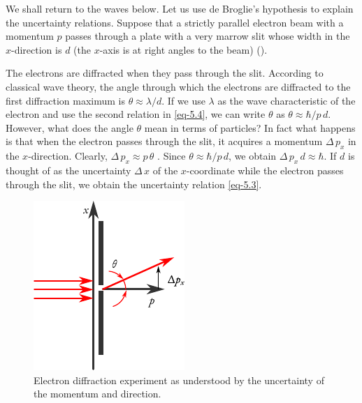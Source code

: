 We shall return to the waves below. Let us use de Broglie's hypothesis
to explain the uncertainty relations. Suppose that a strictly parallel
electron beam with a momentum $p$ passes through a plate with a very
marrow slit whose width in the $x$-direction is $d$ (the $x$-axis is at right
angles to the beam) (). 

The electrons are diffracted when they pass through the slit. According to classical wave theory, the angle through which the electrons are diffracted to the first diffraction maximum is $\theta \approx \lambda / d$. If we use $\lambda$ as the wave characteristic of the electron and use the second relation in \eqref{eq-5.4}, we can write $\theta$ as $\theta \approx \hbar /p \, d$. However, what does the angle $\theta$ mean in terms of particles? In fact what happens is that when the electron passes through the slit, it acquires a momentum $\Delta \, p_{x}$ in the $x$-direction. Clearly,  $\Delta \, p_{x} \approx p \, \theta$ . Since $ \theta \approx \hbar /p \, d$, we obtain  $\Delta \, p_{x} \, d \approx \hbar$. If $d$ is thought of as the uncertainty  $\Delta \, {x}$  of the $x$-coordinate while the electron passes through the slit, we obtain the uncertainty relation \eqref{eq-5.3}.



\begin{figure}
\centering
\includegraphics[width=0.9\linewidth]{figures/diffraction-02.pdf}
\caption{ Electron diffraction experiment as understood by the uncertainty of the momentum and direction.\label{diffraction2}}
\end{figure}


